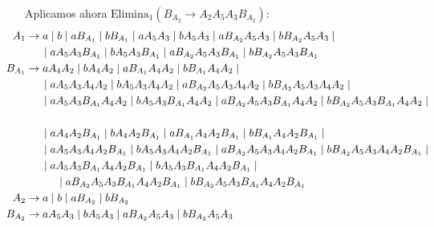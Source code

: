 \documentclass[12pt]{article}
\begin{document}
\begin{ejercicio}[2.5 puntos]
\begin{description}
        Aplicamos ahora $\text{Elimina}_1(B_{A_2}\rightarrow A_2 A_5 A_3 B_{A_2})$:
        \begin{align*}
            \hspace{-2.5cm}A_1 &\to  a \mid b\mid a B_{A_1} \mid b B_{A_1}
                \mid  aA_5A_3 \mid bA_5A_3 \mid   a B_{A_2}A_5A_3 \mid  b B_{A_2}A_5A_3
                \mid \\ & \hspace{0.5cm} \mid  aA_5 A_3 B_{A_1} \mid bA_5 A_3 B_{A_1} \mid   a B_{A_2}A_5 A_3 B_{A_1}
                \mid b B_{A_2}A_5 A_3 B_{A_1} \\
            \hspace{-2.5cm}B_{A_1} &\to  aA_4 A_2 \mid bA_4 A_2\mid a B_{A_1}A_4 A_2 \mid b B_{A_1}A_4 A_2
                \mid \\ & \hspace{0.5cm} \mid  aA_5A_3 A_4 A_2\mid bA_5A_3A_4 A_2 \mid   a B_{A_2}A_5A_3A_4 A_2
                \mid b B_{A_2}A_5A_3A_4 A_2
                \mid \\ & \hspace{0.5cm} \mid  aA_5 A_3 B_{A_1}A_4 A_2 \mid bA_5 A_3 B_{A_1}A_4 A_2
               \mid  a B_{A_2}A_5 A_3 B_{A_1}A_4 A_2 \mid b B_{A_2}A_5 A_3 B_{A_1}A_4 A_2
                \mid \\ \hspace{-2.5cm}\\ & \hspace{0.5cm} \mid  aA_4 A_2 B_{A_1} \mid bA_4 A_2 B_{A_1}\mid a B_{A_1}A_4 A_2 B_{A_1}
                 \mid b B_{A_1}A_4 A_2 B_{A_1}
                \mid \\ & \hspace{0.5cm} \mid  aA_5A_3 A_4 A_2 B_{A_1}\mid bA_5A_3A_4 A_2 B_{A_1} 
                 \mid  a B_{A_2}A_5A_3A_4 A_2 B_{A_1} \mid b B_{A_2}A_5A_3A_4 A_2 B_{A_1}
                \mid \\ & \hspace{0.5cm} \mid  aA_5 A_3 B_{A_1}A_4 A_2 B_{A_1} \mid bA_5 A_3 B_{A_1}A_4 A_2 B_{A_1}
                \mid \\ & \hspace{1cm}  \mid  a B_{A_2}A_5 A_3 B_{A_1}A_4 A_2 B_{A_1} \mid b B_{A_2}A_5 A_3 B_{A_1}A_4 A_2 B_{A_1} \\
            \hspace{-2.5cm}A_2 &\to  a \mid b \mid   a B_{A_2} \mid  b B_{A_2} \\
            \hspace{-2.5cm}B_{A_2} & \to aA_5 A_3 \mid b A_5 A_3\mid   a B_{A_2}A_5 A_3 \mid  b B_{A_2}A_5 A_3

\end{align*}
\end{description}
\end{ejercicio}
\end{document}

